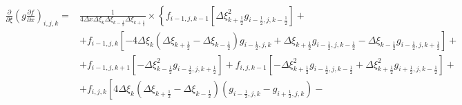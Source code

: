 \documentclass[12pt, a4paper]{article}
\newcommand\onehalf{\frac{1}{2}} %
\begin{document}
\begin{equation*}
    \begin{split}
        \left.
            \frac
                {\partial}
                {\partial \xi}
            \left(
                g
                \frac
                    {\partial f}
                    {\partial x}
            \right)
        \right._{i, j, k}
        = &
        \frac
            {1}
            {
                4 
                \Delta x
                \Delta \xi_{k}
                \Delta \xi_{k - \onehalf}
                \Delta \xi_{k + \onehalf}
            }
        \times
        \left\{
            f_{i - 1, j, k - 1}
            \left[
                \Delta \xi^2_{k + \onehalf}
                g_{i - \onehalf, j, k - \onehalf}
            \right]
            +
        \right.
        \\ &
        \left.
            +
            f_{i - 1, j, k}
            \left[
                -
                4 \Delta \xi_{k}
                \left(
                    \Delta \xi_{k + \onehalf}
                    -
                    \Delta \xi_{k - \onehalf}
                \right)
                g_{i - \onehalf, j, k}
                +
                \Delta \xi_{k + \onehalf}
                g_{i - \onehalf, j, k - \onehalf}
                -
                \Delta \xi_{k - \onehalf}
                g_{i - \onehalf, j, k + \onehalf}
            \right]
            +
        \right.
        \\ &
        \left.
            +
            f_{i - 1, j, k + 1}
            \left[
                -
                \Delta \xi^2_{k - \onehalf}
                g_{i - \onehalf, j, k + \onehalf}
            \right]
            +
            f_{i, j, k - 1}
            \left[
                -
                \Delta \xi^2_{k + \onehalf}
                g_{i - \onehalf, j, k - \onehalf}
                +
                \Delta \xi^2_{k + \onehalf}
                g_{i + \onehalf, j, k - \onehalf}
            \right]
            +
        \right.
        \\ &
        \left.
            +
            f_{i, j, k}
            \left[
                4
                \Delta \xi_{k}
                \left(
                    \Delta \xi_{k + \onehalf}
                    -
                    \Delta \xi_{k - \onehalf}
                \right)
                \left(
                    g_{i - \onehalf, j, k}
                    -
                    g_{i + \onehalf, j, k}
                \right)
                -
            \right.

\end{split}
\end{equation*}
\end{document}
